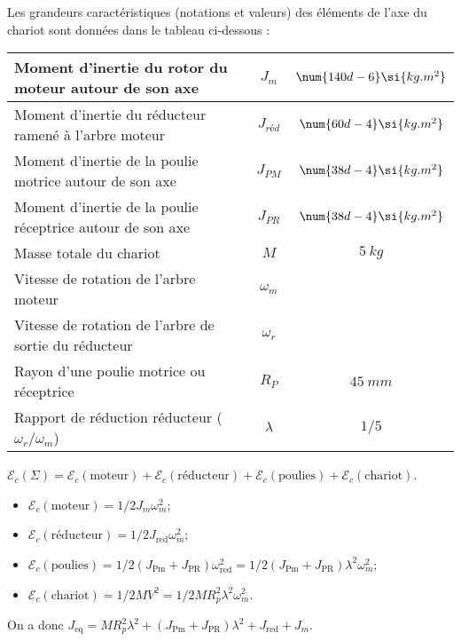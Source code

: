\begin{multicols}{2}
Les grandeurs caractéristiques (notations et valeurs) des éléments de l'axe du chariot sont données dans le tableau ci-dessous :
\begin{center}
\begin{tabular}{|p{3cm}|c|c|}
\hline
Moment d'inertie du rotor du moteur autour de son axe&	$J_m$ & $\num{140d-6}\si{kg.m^2}$ \\ \hline
Moment d'inertie du réducteur ramené à l'arbre moteur&	$J_{réd}$ & $\num{60d-4}\si{kg.m^2}$ \\ \hline
Moment d'inertie de la poulie motrice autour de son axe&	$J_{PM}$	&$ \num{38d-4}\si{kg.m^2}$ \\ \hline
Moment d'inertie de la poulie réceptrice autour de son axe&	$J_{PR}$ & $\num{38d-4}\si{kg.m^2}$ \\ \hline
Masse totale du chariot	&$M$ &$\SI{5}{kg}$ \\ \hline
Vitesse de rotation de l'arbre moteur &$\omega_m$ &  \\ \hline
Vitesse de rotation de l'arbre de sortie du réducteur	&$\omega_r$&  \\ \hline
Rayon d'une poulie motrice ou réceptrice	& $R_P$ &$\SI{45}{mm}$ \\ \hline
Rapport de réduction réducteur ($\omega_r/\omega_m$)	& $\lambda$	&$1/5$ \\ \hline
\end{tabular}
\end{center}
\fi

\ifprof
\begin{corrige}
$\mathcal{E}_c(\Sigma)=\mathcal{E}_c (\text{moteur})+\mathcal{E}_c (\text{réducteur})+\mathcal{E}_c (\text{poulies})+\mathcal{E}_c (\text{chariot})$.
\begin{itemize}
	\item $\mathcal{E}_c (\text{moteur})=1/2 J_m \omega_m^2$;
	\item $\mathcal{E}_c (\text{réducteur})=1/2 J_{\text{red}} \omega_m^2$;
	\item $\mathcal{E}_c (\text{poulies})=1/2 (J_{\text{Pm}}+J_{\text{PR}}  ) \omega_{\text{red}}^2=1/2 (J_{\text{Pm}}+J_{\text{PR}}  ) \lambda^2 \omega_m^2$;
	\item $\mathcal{E}_c (\text{chariot})=1/2 MV^2=1/2 MR_p^2 \lambda^2 \omega_m^2$.
\end{itemize}
On a donc $J_{\text{eq}}=MR_p^2 \lambda^2+(J_{\text{Pm}}+J_{\text{PR}}  ) \lambda^2+J_{\text{red}}+J_m$.


\end{corrige}
\end{multicols}

